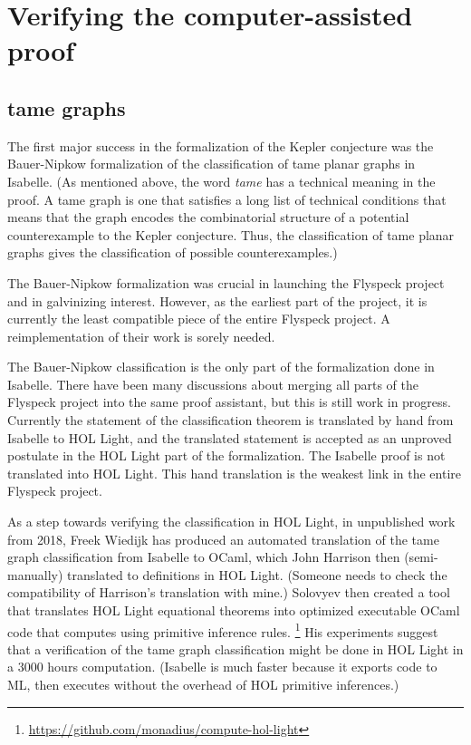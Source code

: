 \documentclass{amsart}
\begin{document}
\section{Verifying the computer-assisted proof}

\subsection{tame graphs}

The first major success in the formalization of the Kepler conjecture
was the Bauer-Nipkow formalization of the classification of tame
planar graphs in Isabelle.  (As mentioned above, the word \emph{tame}
has a technical meaning in the proof.  A tame graph is one that
satisfies a long list of technical conditions that means that the
graph encodes the combinatorial structure of a potential
counterexample to the Kepler conjecture. Thus, the classification of
tame planar graphs gives the classification of possible
counterexamples.)

The Bauer-Nipkow formalization was crucial in launching the Flyspeck
project and in galvinizing interest.  However, as the earliest part of
the project, it is currently the least compatible piece of the entire
Flyspeck project.  A reimplementation of their work is sorely needed.

The Bauer-Nipkow classification is the only part of the formalization
done in Isabelle.  There have been many discussions about merging all
parts of the Flyspeck project into the same proof assistant, but this
is still work in progress.  Currently the statement of the
classification theorem is translated by hand from Isabelle to HOL
Light, and the translated statement is accepted as an unproved
postulate in the HOL Light part of the formalization.  The Isabelle
proof is not translated into HOL Light.  This hand translation is the
weakest link in the entire Flyspeck project.

As a step towards verifying the classification in HOL Light, in
unpublished work from 2018, Freek Wiedijk has produced an automated
translation of the tame graph classification from Isabelle to OCaml,
which John Harrison then (semi-manually) translated to definitions in HOL Light.
(Someone needs to check the compatibility of Harrison's translation with mine.)
Solovyev then created a tool that translates HOL Light equational theorems
into optimized executable OCaml code that computes using primitive inference rules.%
\footnote{\url{https://github.com/monadius/compute-hol-light}} His
experiments suggest that a verification of the tame graph
classification might be done in HOL Light in a 3000 hours computation.
(Isabelle is much faster because it exports code to ML, then executes
without the overhead of HOL primitive inferences.)
\end{document}
